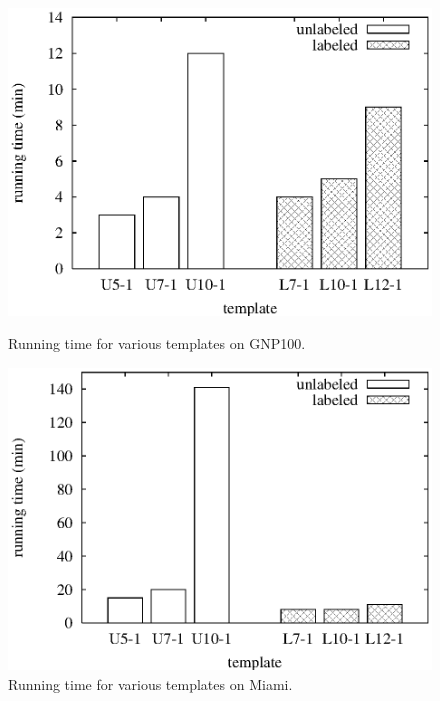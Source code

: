 \begin{figure}[htbp]
\hfill
\begin{minipage}[t]{0.45\linewidth}
\begin{center}
\centerline{\includegraphics[scale=0.35]{plots/amazon-gnp-time.eps}}
\caption{Running time for various templates on GNP100.}
\label{fig:amazon-gnp-time}
\end{center}
\end{minipage}
\hfill
\begin{minipage}[t]{0.45\linewidth}
\begin{center}
\centerline{\includegraphics[scale=0.35]{plots/amazon-miami-time.eps}}
\caption{Running time for various templates on Miami.}
\label{fig:amazon-miami-time.eps}
\end{center}
\end{minipage}
\hfill
\end{figure}



